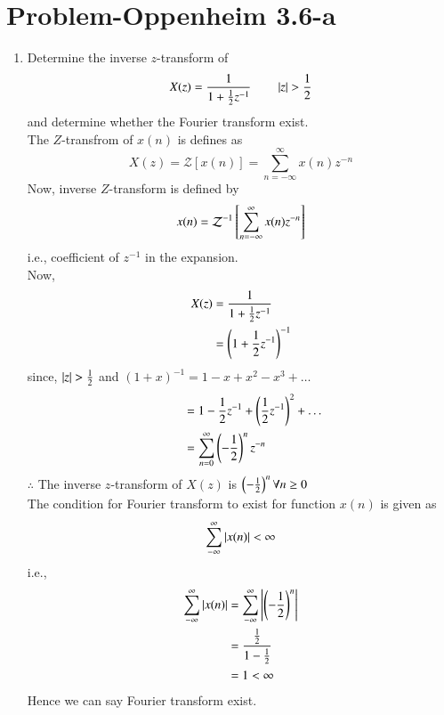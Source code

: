 \documentclass[journal,12pt,twocolumn]{IEEEtran}
\renewcommand\thesection{\arabic{section}}
\begin{document}
\section{Problem-Oppenheim 3.6-a}

\begin{enumerate}[label=\thesection.\arabic*
,ref=\thesection.\theenumi]
\item Determine the inverse $z$-transform of 
\begin{equation}
    X(z)= \frac{1}{1+\frac{1}{2}z^{-1}} \qquad \left\vert z\right\vert>\frac{1}{2}
\end{equation} 
and determine whether the Fourier transform exist.\\
\solution The $Z$-transfrom of $x(n)$ is defines as 
\begin{equation}
    X(z) = \mathcal{Z}[x(n)] = \sum_{n=-\infty}^\infty x(n)z^{-n}
\end{equation}
Now, inverse $Z$-transform is defined by 
\begin{equation}
    x(n) = \mathcal{Z}^{-1}{}\left[\sum_{n=-\infty}^\infty x(n)z^{-n}\right]
\end{equation}
i.e., coefficient of $z^{-1}$ in the expansion.\\
Now, 
\begin{align}
    X(z) &= \frac{1}{1+\frac{1}{2}z^{-1}}\\
    &=\left(1+\frac{1}{2}z^{-1}\right)^{-1}
\end{align}
since, $\left\vert z\right\vert>\frac{1}{2}$ and $(1+x)^{-1} = 1-x+x^2-x^3+\dots$
\begin{align}
    \qquad &= 1 - \frac{1}{2}z^{-1} + \left(\frac{1}{2}z^{-1}\right)^2+\dots\\
    &= \sum_{n=0}^\infty \left(-\frac{1}{2}\right)^n z^{-n}
\end{align}
$\therefore$ The inverse $z$-transform of $X(z)$ is $\left(-\frac{1}{2}\right)^n \forall n\ge 0$\\
The condition for Fourier transform to exist for function $x(n)$ is given as
\begin{equation}
    \sum_{-\infty}^\infty \left\vert x(n)\right\vert < \infty
\end{equation}
i.e.,
\begin{align}
    \sum_{-\infty}^\infty \left\vert x(n)\right\vert &=  \sum_{-\infty}^\infty \left\vert\left(-\frac{1}{2}\right)^n\right\vert\\
    &= \frac{\frac{1}{2}}{1-\frac{1}{2}}\\
    &=1 < \infty
\end{align}
Hence we can say Fourier transform exist.
\end{enumerate}
\end{document}
